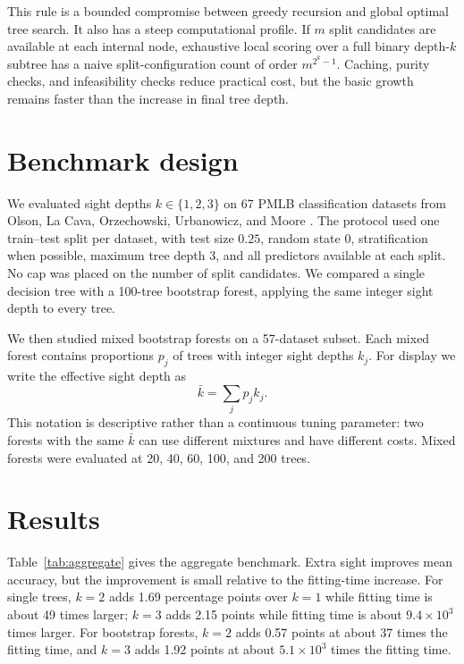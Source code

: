 \documentclass[12pt]{article}
\begin{document}
This rule is a bounded compromise between greedy recursion and global optimal tree search. It also has a steep computational profile. If $m$ split candidates are available at each internal node, exhaustive local scoring over a full binary depth-$k$ subtree has a naive split-configuration count of order $m^{2^k-1}$. Caching, purity checks, and infeasibility checks reduce practical cost, but the basic growth remains faster than the increase in final tree depth.

\section{Benchmark design}

We evaluated sight depths $k\in\{1,2,3\}$ on 67 PMLB classification datasets from Olson, La Cava, Orzechowski, Urbanowicz, and Moore \citeyearpar{olson2017pmlb}. The protocol used one train--test split per dataset, with test size $0.25$, random state $0$, stratification when possible, maximum tree depth $3$, and all predictors available at each split. No cap was placed on the number of split candidates. We compared a single decision tree with a 100-tree bootstrap forest, applying the same integer sight depth to every tree.

We then studied mixed bootstrap forests on a 57-dataset subset. Each mixed forest contains proportions $p_j$ of trees with integer sight depths $k_j$. For display we write the effective sight depth as
\[
\bar{k}=\sum_j p_j k_j .
\]
This notation is descriptive rather than a continuous tuning parameter: two forests with the same $\bar{k}$ can use different mixtures and have different costs. Mixed forests were evaluated at 20, 40, 60, 100, and 200 trees.

\section{Results}

Table~\ref{tab:aggregate} gives the aggregate benchmark. Extra sight improves mean accuracy, but the improvement is small relative to the fitting-time increase. For single trees, $k=2$ adds 1.69 percentage points over $k=1$ while fitting time is about 49 times larger; $k=3$ adds 2.15 points while fitting time is about $9.4\times 10^3$ times larger. For bootstrap forests, $k=2$ adds 0.57 points at about 37 times the fitting time, and $k=3$ adds 1.92 points at about $5.1\times 10^3$ times the fitting time.
\end{document}

